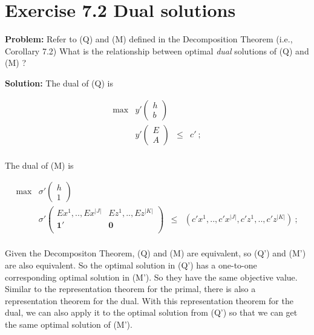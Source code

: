 \section{Exercise 7.2 Dual solutions}
\textbf{Problem:} Refer to (Q) and (M) defined in the Decomposition Theorem (i.e., Corollary 7.2) What is the relationship between optimal \emph{dual} solutions of (Q) and (M) ?

\textbf{Solution:} The dual of (Q) is

\[
\tag{$Q'$}
\begin{array}{ccrrcl}
 \max & y'\left(
  \begin{array}{c}
   h\\
   b
  \end{array}
\right)  &      &   \\
      &  y'\left(
  \begin{array}{c}
   E\\
   A
  \end{array}
\right)  &   \leq  & c'~; \\
\end{array}
\]

The dual of (M) is

\[
\tag{$M'$}
\begin{array}{ccrrcl}
 \max & \sigma'\left(
  \begin{array}{c}
   h\\
   1
  \end{array}
\right)  &      &   \\
      &  \sigma'\left(
  \begin{array}{cc}
   Ex^1,..,Ex^{|J|} & Ez^1,..,Ez^{|K|}\\
   \mathbf{1}' & \mathbf{0}\\
  \end{array}
\right)  &   \leq  & (c'x^1,..,c'x^{|J|},c'z^1,..,c'z^{|K|})~; \\
\end{array}
\]

Given the Decompositon Theorem, (Q) and (M) are equivalent, so (Q') and (M') are also equivalent. So the optimal solution in (Q') has a one-to-one corresponding optimal solution in (M'). So they have the same objective value. Similar to the representation theorem for the primal, there is also a representation theorem for the dual. With this representation theorem for the dual, we can also apply it to the optimal solution from (Q') so that we can get the same optimal solution of (M').